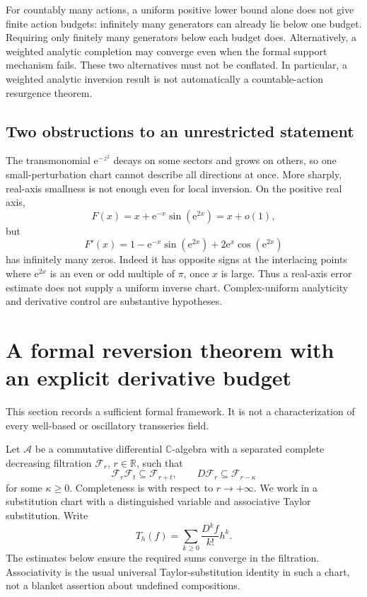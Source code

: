 \documentclass[11pt,a4paper]{article}
\numberwithin{equation}{section}
\theoremstyle{definition}
\theoremstyle{remark}
\newcommand{\C}{\mathbb C}
\newcommand{\R}{\mathbb R}
\newcommand{\e}{\mathrm e}
\begin{document}
For countably many actions, a uniform positive lower bound alone does not give finite action budgets: infinitely many generators can already lie below one budget. Requiring only finitely many generators below each budget does. Alternatively, a weighted analytic completion may converge even when the formal support mechanism fails. These two alternatives must not be conflated. In particular, a weighted analytic inversion result is not automatically a countable-action resurgence theorem.

\subsection{Two obstructions to an unrestricted statement}
The transmonomial $\e^{-z^2}$ decays on some sectors and grows on others, so one small-perturbation chart cannot describe all directions at once. More sharply, real-axis smallness is not enough even for local inversion. On the positive real axis,
\begin{equation}
 F(x)=x+\e^{-x}\sin(\e^{2x})=x+o(1),
\end{equation}
but
\[
 F'(x)=1-\e^{-x}\sin(\e^{2x})+2\e^x\cos(\e^{2x})
\]
has infinitely many zeros. Indeed it has opposite signs at the interlacing points where $\e^{2x}$ is an even or odd multiple of $\pi$, once $x$ is large. Thus a real-axis error estimate does not supply a uniform inverse chart. Complex-uniform analyticity and derivative control are substantive hypotheses.

\section{A formal reversion theorem with an explicit derivative budget}
\label{sec:formal}
This section records a sufficient formal framework. It is not a characterization of every well-based or oscillatory transseries field.

Let $\mathcal A$ be a commutative differential $\C$-algebra with a separated complete decreasing filtration $\mathcal F_r$, $r\in\R$, such that
\begin{equation}
 \mathcal F_r\mathcal F_t\subseteq\mathcal F_{r+t},
 \qquad D\mathcal F_r\subseteq\mathcal F_{r-\kappa}
 \label{eq:filtration}
\end{equation}
for some $\kappa\geq0$. Completeness is with respect to $r\to+\infty$. We work in a substitution chart with a distinguished variable and associative Taylor substitution. Write
\[
 T_h(f)=\sum_{k\geq0}\frac{D^kf}{k!}h^k.
\]
The estimates below ensure the required sums converge in the filtration. Associativity is the usual universal Taylor-substitution identity in such a chart, not a blanket assertion about undefined compositions.
\end{document}
